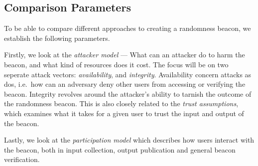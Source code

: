 \subsection{Comparison Parameters}
\label{sub:comparison_parameters}
To be able to compare different approaches to creating a randomness beacon, we establish the following parameters.

Firstly, we look at the \emph{attacker model} ---
What can an attacker do to harm the beacon, and what kind of resources does it cost.
The focus will be on two seperate attack vectors: \emph{availability}, and \emph{integrity}.
Availability concern attacks as \gls{dos}, i.e.~how can an adversary deny other users from accessing or verifying the beacon.
Integrity revolves around the attacker's ability to tarnish the outcome of the randomness beacon.
This is also closely related to the \emph{trust assumptions}, which examines what it takes for a given user to trust the input and output of the beacon.

Lastly, we look at the \emph{participation model} which describes how users interact with the beacon, both in input collection, output publication and general beacon verification.
